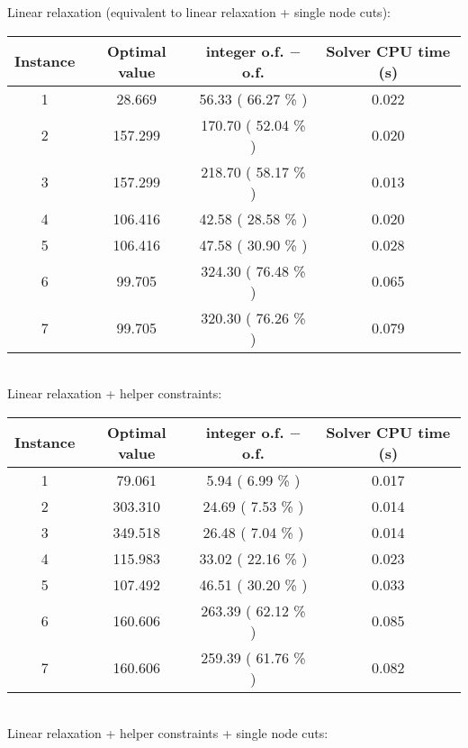 Linear relaxation (equivalent to linear relaxation + single node cuts):
\begin{table}[h!]
	\centering
	\begin{tabular}{|c|c|c|c|}
		\hline
		\textbf{Instance} & \textbf{Optimal value} & \textbf{integer o.f. $-$ o.f.} & \textbf{Solver CPU time (s)} \\
		\hline
		1 &  28.669 &  56.33 ( 66.27 \% ) & 0.022 \\ \hline
		2 & 157.299 & 170.70 ( 52.04 \% ) & 0.020 \\ \hline
		3 & 157.299 & 218.70 ( 58.17 \% ) & 0.013 \\ \hline
		4 & 106.416 &  42.58 ( 28.58 \% ) & 0.020 \\ \hline
		5 & 106.416 &  47.58 ( 30.90 \% ) & 0.028 \\ \hline
		6 &  99.705 & 324.30 ( 76.48 \% ) & 0.065 \\ \hline
		7 &  99.705 & 320.30 ( 76.26 \% ) & 0.079 \\ \hline
	\end{tabular}
	\label{tab:instance_costs}
\end{table}
\\
Linear relaxation + helper constraints:
\begin{table}[h!]
	\centering
	\begin{tabular}{|c|c|c|c|}
		\hline
		\textbf{Instance} & \textbf{Optimal value} & \textbf{integer o.f. $-$ o.f.} & \textbf{Solver CPU time (s)} \\
		\hline
		1 &  79.061 &   5.94 (  6.99 \% ) & 0.017 \\ \hline
		2 & 303.310 &  24.69 (  7.53 \% ) & 0.014 \\ \hline
		3 & 349.518 &  26.48 (  7.04 \% ) & 0.014 \\ \hline
		4 & 115.983 &  33.02 ( 22.16 \% ) & 0.023 \\ \hline
		5 & 107.492 &  46.51 ( 30.20 \% ) & 0.033 \\ \hline
		6 & 160.606 & 263.39 ( 62.12 \% ) & 0.085 \\ \hline
		7 & 160.606 & 259.39 ( 61.76 \% ) & 0.082 \\ \hline
	\end{tabular}
	\label{tab:instance_costs}
\end{table}
\\
Linear relaxation + helper constraints + single node cuts:
